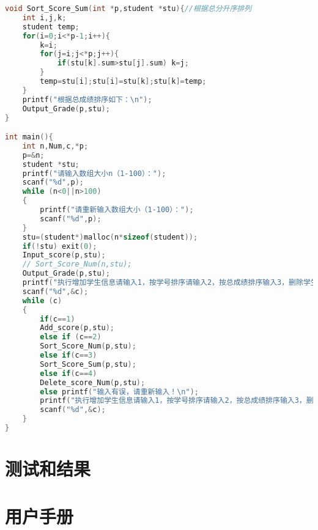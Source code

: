 \documentclass{ctexart}
\begin{document}
\begin{lstlisting}[language={c}]
void Sort_Score_Sum(int *p,student *stu){//根据总分升序排列
	int i,j,k;
	student temp;
	for(i=0;i<*p-1;i++){
		k=i;
		for(j=i;j<*p;j++){
			if(stu[k].sum>stu[j].sum) k=j;
		}
		temp=stu[i];stu[i]=stu[k];stu[k]=temp;
	}
	printf("根据总成绩排序如下：\n");
	Output_Grade(p,stu);
}

int main(){
	int n,Num,c,*p;
	p=&n;
	student *stu;
	printf("请输入数组大小n（1-100）：");
	scanf("%d",p);
	while (n<0||n>100)
	{
		printf("请重新输入数组大小（1-100）：");
		scanf("%d",p);
	}
	stu=(student*)malloc(n*sizeof(student));
	if(!stu) exit(0);
	Input_score(p,stu);
	// Sort_Score_Num(n,stu);
	Output_Grade(p,stu);
	printf("执行增加学生信息请输入1，按学号排序请输入2，按总成绩排序输入3，删除学生信息请输入4，退出请输入0：");//再初始化学生信息后，选择将要进行的操作
	scanf("%d",&c);
	while (c)
	{
		if(c==1)
		Add_score(p,stu);
		else if (c==2)
		Sort_Score_Num(p,stu);
		else if(c==3)
		Sort_Score_Sum(p,stu);
		else if(c==4)
		Delete_score_Num(p,stu);
		else printf("输入有误，请重新输入！\n");
		printf("执行增加学生信息请输入1，按学号排序请输入2，按总成绩排序输入3，删除学生信息请输入4，退出请输入0：");
		scanf("%d",&c);
	}
}
\end{lstlisting}

\section{测试和结果}
\section{用户手册}
\end{document}
